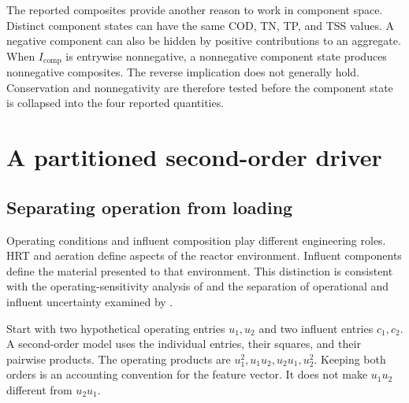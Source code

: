 The reported composites provide another reason to work in component space. Distinct component states can have the same COD, TN, TP, and TSS values. A negative component can also be hidden by positive contributions to an aggregate. When \(I_{\mathrm{comp}}\) is entrywise nonnegative, a nonnegative component state produces nonnegative composites. The reverse implication does not generally hold. Conservation and nonnegativity are therefore tested before the component state is collapsed into the four reported quantities.

\section{A partitioned second-order driver}

\subsection{Separating operation from loading}

Operating conditions and influent composition play different engineering roles. HRT and aeration define aspects of the reactor environment. Influent components define the material presented to that environment. This distinction is consistent with the operating-sensitivity analysis of \citet{Araujo2013} and the separation of operational and influent uncertainty examined by \citet{Machado2014}.

Start with two hypothetical operating entries \(u_1,u_2\) and two influent entries \(c_1,c_2\). A second-order model uses the individual entries, their squares, and their pairwise products. The operating products are \(u_1^2,u_1u_2,u_2u_1,u_2^2\). Keeping both orders is an accounting convention for the feature vector. It does not make \(u_1u_2\) different from \(u_2u_1\).

